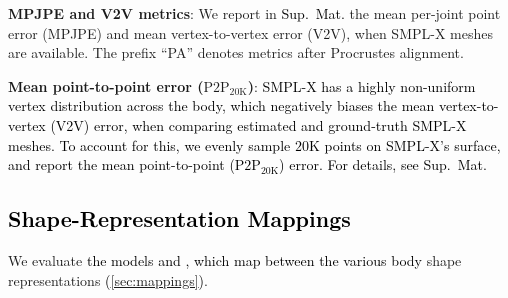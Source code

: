 \documentclass[10pt,twocolumn,letterpaper]{article}
\newcommand{\qheading}[1]{\noindent\textbf{#1}:}
\newcommand{\TODO}[1]{\xspace{\color{red} #1}\xspace}
\renewcommand{\TODO}[1]{\xspace{\color{black} #1}\xspace}
\newcommand{\AtoS}{\text{\mbox{A2S}}\xspace}
\newcommand{\StoA}{\text{\mbox{S2A}}\xspace}
\newcommand{\smplx}{\mbox{SMPL-X}\xspace}
\newcommand{\smplX}{\smplx}
\newcommand{\supmat}{{\mbox{\textcolor{black}{Sup.~Mat.}}}\xspace}
\newcommand{\vtov}{\mbox{V2V}\xspace}
\newcommand{\VtoV}{\vtov}
\newcommand{\vtovHD}{\mbox{$\text{P2P}_{20\text{K}}$}\xspace}
\newcommand{\mpjpe}{\mbox{MPJPE}\xspace}
\newcommand{\cameraready}[1]{\textcolor{Fuchsia}{{#1}}\xspace}
\renewcommand{\cameraready}[1]{\textcolor{black}{{#1}}\xspace}
\begin{document}
\qheading{\mpjpe and \VtoV metrics}
We
report in \supmat
the
mean per-joint point error (\mpjpe) and
mean vertex-to-vertex error (\vtov), when \smplx meshes are available. 
The prefix ``PA'' denotes metrics after Procrustes alignment. 


\qheading{Mean point-to-point error (\vtovHD)}
\TODO{
\cameraready{\smplx has a highly non-uniform vertex distribution across the body, which negatively biases the mean vertex-to-vertex (\VtoV) error, when comparing estimated and ground-truth \smplX meshes.
To account for this, we evenly sample $20$K points on \smplX's surface,
and report the mean point-to-point (\vtovHD)
error.
For details, see \supmat}
}

 \subsection{\cameraready{Shape-Representation Mappings}}       \label{sec:exp_shape_est}


We evaluate \cameraready{the models \AtoS and \StoA, which map between the various body} shape representations \cameraready{(\cref{sec:mappings})}.
\end{document}
